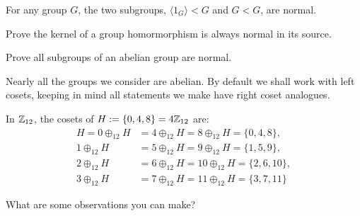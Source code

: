 \documentclass[../algebraNotesMSRI-UP2016.tex]{subfiles}
\begin{document}
\begin{frame}
\begin{ex}\label{ex:trivialNormal}
For any group $G$, the two  subgroups, $\langle 1_G\rangle<G$ and $G<G$, are normal.
\end{ex}

\smallGap
\begin{UNABexe}\label{exe:normalKernel}
Prove the kernel of a group homormorphism is always normal in its source.
\end{UNABexe}

\smallGap
\begin{UNABexe}\label{exe:normalSubgroups}
Prove all subgroups of an abelian group are normal.
\end{UNABexe}

\smallGap
Nearly all the groups we consider are abelian.  By default we shall work with left cosets, keeping in mind all statements we make have right coset analogues.  
\end{frame}

\begin{frame}
\begin{ex}
In $\mathbb Z_{12}$, the cosets of $H:=\{0,4,8\}=4\mathbb Z_{12}$ are:
\begin{align*}
H = 0\oplus_{12}H &= 4\oplus_{12}H = 8\oplus_{12}H = \{0,4,8\}, \\
	 1\oplus_{12}H &= 5\oplus_{12}H = 9\oplus_{12}H = \{1,5,9\},	\\
	 2\oplus_{12}H &= 6\oplus_{12}H = 10\oplus_{12}H = \{2,6,10\}, \\
	 3\oplus_{12}H &= 7\oplus_{12}H = 11\oplus_{12}H = \{3,7,11\} 
\end{align*}
\end{ex}

\smallGap
\begin{que}
What are some observations you can make?
\end{que}
\end{frame}
\end{document}
